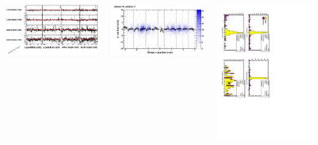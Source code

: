 \documentclass[compress]{beamer}
\begin{document}
\begin{frame}
\begin{columns}
\includegraphics[width=\linewidth]{NOV4_fitfunctions/MBwhCst1sec10_polynomials.png}

\includegraphics[width=\linewidth]{NOV4_mapplots/DTvsphi_st1whC_x.png}

\includegraphics[height=\linewidth, angle=90]{NOV4DT_median_goodDT.pdf}
\end{columns}
\end{frame}
\end{document}
